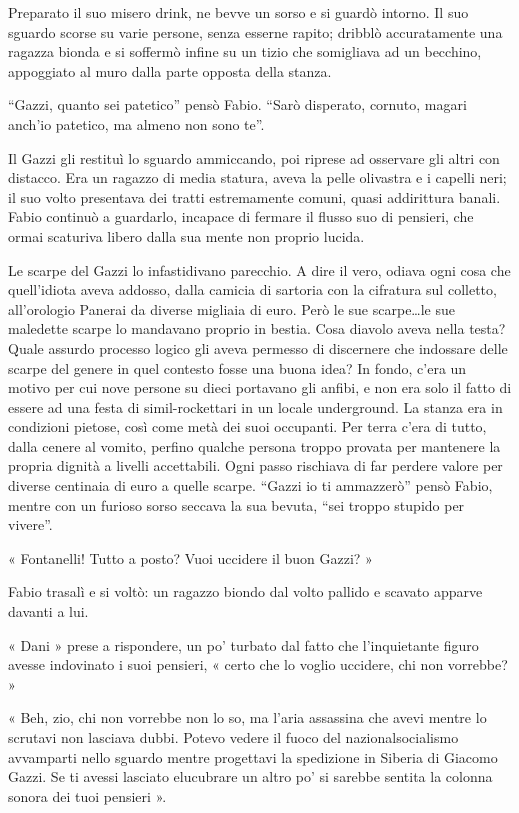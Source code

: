 Preparato il suo misero drink, ne bevve un sorso e si guardò intorno. Il suo sguardo scorse su varie persone, senza esserne rapito; dribblò accuratamente una ragazza bionda e si soffermò infine su un tizio che somigliava ad un becchino, appoggiato al muro dalla parte opposta della stanza.

``Gazzi, quanto sei patetico'' pensò Fabio. ``Sarò disperato, cornuto, magari anch'io patetico, ma almeno non sono te''.

Il Gazzi gli restituì lo sguardo ammiccando, poi riprese ad osservare gli altri con distacco. Era un ragazzo di media statura, aveva la pelle olivastra e i capelli neri; il suo volto presentava dei tratti estremamente comuni, quasi addirittura banali. Fabio continuò a guardarlo, incapace di fermare il flusso suo di pensieri, che ormai scaturiva libero dalla sua mente non proprio lucida.

Le scarpe del Gazzi lo infastidivano parecchio. A dire il vero, odiava ogni cosa che quell'idiota aveva addosso, dalla camicia di sartoria con la cifratura sul colletto, all'orologio Panerai da diverse migliaia di euro. Però le sue scarpe\ldots le sue maledette scarpe lo mandavano proprio in bestia. Cosa diavolo aveva nella testa? Quale assurdo processo logico gli aveva permesso di discernere che indossare delle scarpe del genere in quel contesto fosse una buona idea? In fondo, c'era un motivo per cui nove persone su dieci portavano gli anfibi, e non era solo il fatto di essere ad una festa di simil-rockettari in un locale underground. La stanza era in condizioni pietose, così come metà dei suoi occupanti. Per terra c'era di tutto, dalla cenere al vomito, perfino qualche persona troppo provata per mantenere la propria dignità a livelli accettabili. Ogni passo rischiava di far perdere valore per diverse centinaia di euro a quelle scarpe. ``Gazzi io ti ammazzerò'' pensò Fabio, mentre con un furioso sorso seccava la sua bevuta, ``sei troppo stupido per vivere''.

« Fontanelli! Tutto a posto? Vuoi uccidere il buon Gazzi? »

Fabio trasalì e si voltò: un ragazzo biondo dal volto pallido e scavato apparve davanti a lui.

« Dani » prese a rispondere, un po' turbato dal fatto che l'inquietante figuro avesse indovinato i suoi pensieri, « certo che lo voglio uccidere, chi non vorrebbe? »

« Beh, zio, chi non vorrebbe non lo so, ma l'aria assassina che avevi mentre lo scrutavi non lasciava dubbi. Potevo vedere il fuoco del nazionalsocialismo avvamparti nello sguardo mentre progettavi la spedizione in Siberia di Giacomo Gazzi. Se ti avessi lasciato elucubrare un altro po' si sarebbe sentita la colonna sonora dei tuoi pensieri ».

